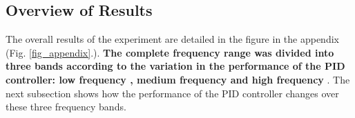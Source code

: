 \documentclass[conference]{IEEEtran}
\begin{document}
\subsection{Overview of Results}
The overall results of the experiment are detailed in the figure in the appendix (Fig. \ref{fig_appendix}.). \textbf{The complete frequency range was divided into three bands according to the variation in the performance of the PID controller: low frequency , medium frequency  and high frequency }. The next subsection shows how the performance of the PID controller changes over these three frequency bands.
\end{document}

